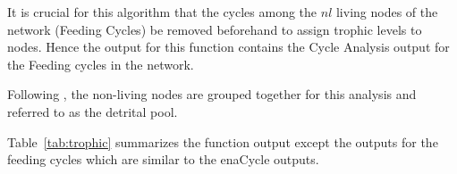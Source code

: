 \documentclass[article]{jss}
\begin{document}
It is crucial for this algorithm that the cycles among the $nl$ living nodes of the
network (Feeding Cycles) be removed beforehand to assign trophic levels
to nodes. Hence the output for this function contains the Cycle Analysis
output for the Feeding cycles in the network.

Following \citet{ulanowicz91}, the non-living nodes are grouped together for
this analysis and referred to as the detrital pool.

Table~\ref{tab:trophic} summarizes the function output except the outputs
for the feeding cycles which are similar to the enaCycle outputs.

\begin{Schunk}
\end{Schunk}
\end{document}
